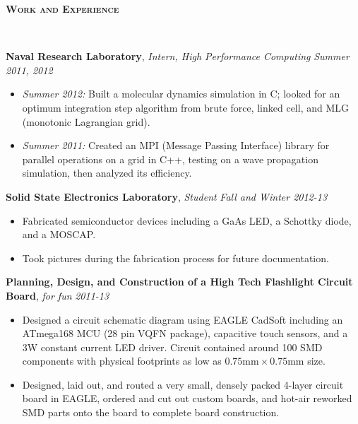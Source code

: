 \documentclass{article}
\newenvironment{changemargin}[2]{%
  \begin{list}{}{%
    \setlength{\topsep}{0pt}%
    \setlength{\leftmargin}{#1}%
    \setlength{\rightmargin}{#2}%
    \setlength{\listparindent}{\parindent}%
    \setlength{\itemindent}{\parindent}%
    \setlength{\parsep}{\parskip}%
  }%
  \item[]}{\end{list}
}
\newcommand{\lineover}{
	\begin{changemargin}{-0.05in}{-0.05in}
		\vspace*{-8pt}
		\hrulefill \\
		\vspace*{-2pt}
	\end{changemargin}
}
\newcommand{\header}[1]{
	\begin{changemargin}{-0.5in}{-0.5in}
		{\large \textbf{\scshape{#1}}}\\
  	\lineover
	\end{changemargin}
}
\newenvironment{body} {
	\vspace*{-16pt}
	\begin{changemargin}{-0.25in}{-0.5in}
  }	
	{\end{changemargin}
}
\begin{document}
\smallskip


\header{Work and Experience}

\begin{body}
	\vspace{14pt}
	\textbf{Naval Research Laboratory}, \emph{Intern, High Performance Computing} \hfill \emph{Summer 2011, 2012}\\
	\begin{itemize}%
		\item \emph{Summer 2012:} Built a molecular dynamics simulation in C; looked for an optimum integration step algorithm from brute force, linked cell, and MLG (monotonic Lagrangian grid).
		\item \emph{Summer 2011:} Created an MPI (Message Passing Interface) library for parallel operations on a grid in C++, testing on a wave propagation simulation, then analyzed its efficiency.
	\end{itemize}

	\medskip
	
	\textbf{Solid State Electronics Laboratory}, \emph{Student} \hfill \emph{Fall and Winter 2012-13}\\
	\begin{itemize}%
		\item Fabricated semiconductor devices including a GaAs LED, a Schottky diode, and a MOSCAP.
		\item Took pictures during the fabrication process for future documentation.
	\end{itemize}
	
	\medskip	
	
	\textbf{Planning, Design, and Construction of a High Tech Flashlight Circuit Board}, \emph{for fun} \hfill \emph{2011-13}\\
	\begin{itemize}%
		\item Designed a circuit schematic diagram using EAGLE CadSoft including an ATmega168 MCU (28 pin VQFN package), capacitive touch sensors, and a 3W constant current LED driver.  Circuit contained around 100 SMD components with physical footprints as low as $0.75\text{mm} \times 0.75 \text{mm}$ size.
		\item Designed, laid out, and routed a very small, densely packed 4-layer circuit board in EAGLE, ordered and cut out custom boards, and hot-air reworked SMD parts onto the board to complete board construction.
	\end{itemize}
\end{body}
\end{document}
